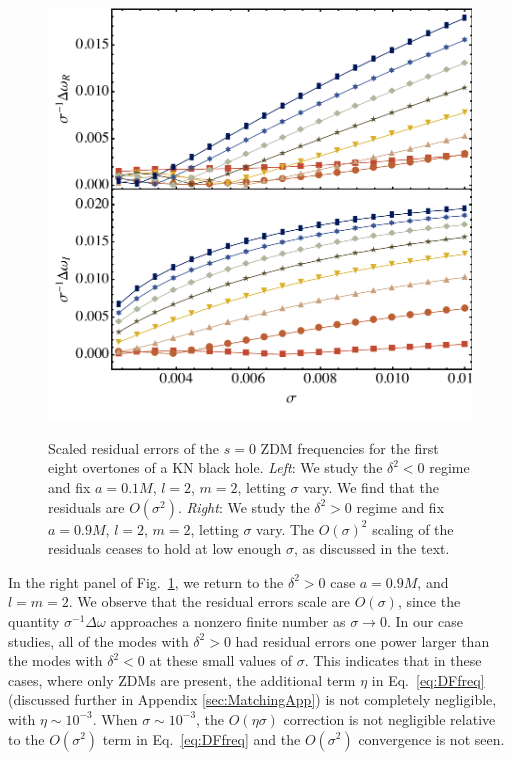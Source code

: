 \begin{refsection}
\begin{figure}[tb]
\includegraphics[width =1.0 \columnwidth]{chapter_extremal/etc/sigplot_a_9_s_0.pdf} \\
\vspace{-5mm}
\caption{Scaled residual errors of the $s=0$ ZDM frequencies for the first eight overtones of a KN black hole. 
{\it Left}: We study the $\delta^2<0$ regime and fix $a  = 0.1 M$, $l=2$, $m =2$, letting $\sigma$ vary. We find that the residuals are $O(\sigma^2)$. {\it Right}: We study the $\delta^2>0$ regime and fix $a  = 0.9 M$, $l=2$, $m =2$, letting $\sigma$ vary. The $O(\sigma)^2$ scaling of the residuals ceases to hold at low enough $\sigma$, as discussed in the text.}
\label{fig:DFsigcon}
\end{figure}

In the right panel of Fig.~\ref{fig:DFsigcon}, we return to the $\delta^2 >0$ case $a=0.9 M$, and $l = m =2$. 
We observe that the residual errors scale are $O(\sigma)$, since the quantity $\sigma^{-1}\Delta \omega$ approaches a nonzero finite number as $\sigma \to 0$.  
In our case studies, all of the modes with $\delta^2 >0$ had residual errors one power larger than the modes with $\delta^2 < 0$ at these small values of $\sigma$.
This indicates that in these cases, where only ZDMs are present, the additional term $\eta$ in Eq.~\eqref{eq:DFfreq} (discussed further in Appendix \ref{sec:MatchingApp}) is not completely negligible, with $\eta \sim 10^{-3}$.
When $\sigma \sim 10^{-3}$, the $O(\eta\sigma)$ correction is not negligible relative to the $O(\sigma^2)$ term in  Eq.~\eqref{eq:DFfreq} and the $O(\sigma^2)$ convergence is not seen.


\end{refsection}
